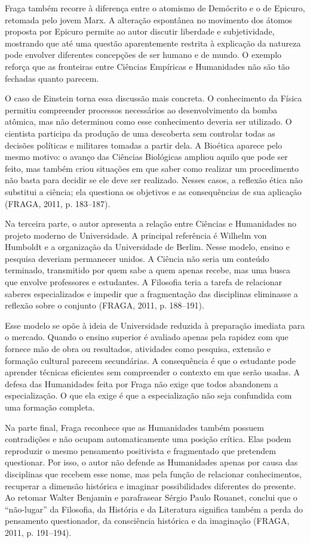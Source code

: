 \documentclass[12pt,a4paper]{article}
\begin{document}
Fraga também recorre à diferença entre o atomismo de Demócrito e o de Epicuro, retomada pelo jovem Marx. A alteração espontânea no movimento dos átomos proposta por Epicuro permite ao autor discutir liberdade e subjetividade, mostrando que até uma questão aparentemente restrita à explicação da natureza pode envolver diferentes concepções de ser humano e de mundo. O exemplo reforça que as fronteiras entre Ciências Empíricas e Humanidades não são tão fechadas quanto parecem.

O caso de Einstein torna essa discussão mais concreta. O conhecimento da Física permitiu compreender processos necessários ao desenvolvimento da bomba atômica, mas não determinou como esse conhecimento deveria ser utilizado. O cientista participa da produção de uma descoberta sem controlar todas as decisões políticas e militares tomadas a partir dela. A Bioética aparece pelo mesmo motivo: o avanço das Ciências Biológicas ampliou aquilo que pode ser feito, mas também criou situações em que saber como realizar um procedimento não basta para decidir se ele deve ser realizado. Nesses casos, a reflexão ética não substitui a ciência; ela questiona os objetivos e as consequências de sua aplicação (FRAGA, 2011, p. 183--187).

Na terceira parte, o autor apresenta a relação entre Ciências e Humanidades no projeto moderno de Universidade. A principal referência é Wilhelm von Humboldt e a organização da Universidade de Berlim. Nesse modelo, ensino e pesquisa deveriam permanecer unidos. A Ciência não seria um conteúdo terminado, transmitido por quem sabe a quem apenas recebe, mas uma busca que envolve professores e estudantes. A Filosofia teria a tarefa de relacionar saberes especializados e impedir que a fragmentação das disciplinas eliminasse a reflexão sobre o conjunto (FRAGA, 2011, p. 188--191).

Esse modelo se opõe à ideia de Universidade reduzida à preparação imediata para o mercado. Quando o ensino superior é avaliado apenas pela rapidez com que fornece mão de obra ou resultados, atividades como pesquisa, extensão e formação cultural parecem secundárias. A consequência é que o estudante pode aprender técnicas eficientes sem compreender o contexto em que serão usadas. A defesa das Humanidades feita por Fraga não exige que todos abandonem a especialização. O que ela exige é que a especialização não seja confundida com uma formação completa.

Na parte final, Fraga reconhece que as Humanidades também possuem contradições e não ocupam automaticamente uma posição crítica. Elas podem reproduzir o mesmo pensamento positivista e fragmentado que pretendem questionar. Por isso, o autor não defende as Humanidades apenas por causa das disciplinas que recebem esse nome, mas pela função de relacionar conhecimentos, recuperar a dimensão histórica e imaginar possibilidades diferentes do presente. Ao retomar Walter Benjamin e parafrasear Sérgio Paulo Rouanet, conclui que o ``não-lugar'' da Filosofia, da História e da Literatura significa também a perda do pensamento questionador, da consciência histórica e da imaginação (FRAGA, 2011, p. 191--194).
\end{document}
